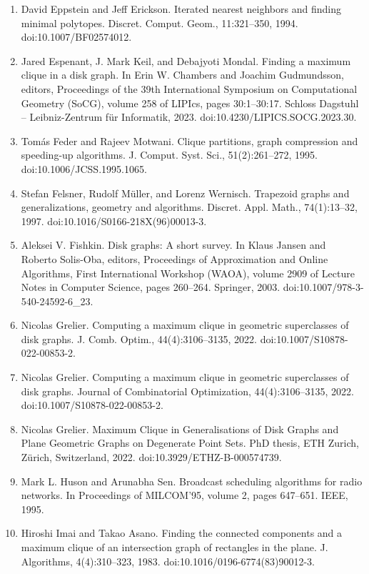\begin{enumerate}
\item[]  [20]  David Eppstein and Jeff Erickson.  Iterated nearest neighbors and finding minimal polytopes.  Discret. Comput. Geom., 11:321–350, 1994.  doi:10.1007/BF02574012.  
\item[]  [21]  Jared Espenant, J. Mark Keil, and Debajyoti Mondal.  Finding a maximum clique in a disk graph.  In Erin W. Chambers and Joachim Gudmundsson, editors, Proceedings of the 39th International Symposium on Computational Geometry (SoCG), volume 258 of LIPIcs, pages 30:1–30:17. Schloss Dagstuhl – Leibniz-Zentrum für Informatik, 2023.  doi:10.4230/LIPICS.SOCG.2023.30.  
\item[]  [22]  Tomás Feder and Rajeev Motwani.  Clique partitions, graph compression and speeding-up algorithms.  J. Comput. Syst. Sci., 51(2):261–272, 1995.  doi:10.1006/JCSS.1995.1065.  
\item[]  [23]  Stefan Felsner, Rudolf Müller, and Lorenz Wernisch.  Trapezoid graphs and generalizations, geometry and algorithms.  Discret. Appl. Math., 74(1):13–32, 1997.  doi:10.1016/S0166-218X(96)00013-3.  
\item[]  [24]  Aleksei V. Fishkin.  Disk graphs: A short survey.  In Klaus Jansen and Roberto Solis-Oba, editors, Proceedings of Approximation and Online Algorithms, First International Workshop (WAOA), volume 2909 of Lecture Notes in Computer Science, pages 260–264. Springer, 2003.  doi:10.1007/978-3-540-24592-6\_23.  
\item[]  [25]  Nicolas Grelier.  Computing a maximum clique in geometric superclasses of disk graphs.  J. Comb. Optim., 44(4):3106–3135, 2022.  doi:10.1007/S10878-022-00853-2.  
\item[]  [26]  Nicolas Grelier.  Computing a maximum clique in geometric superclasses of disk graphs.  Journal of Combinatorial Optimization, 44(4):3106–3135, 2022.  doi:10.1007/S10878-022-00853-2.  
\item[]  [27]  Nicolas Grelier.  Maximum Clique in Generalisations of Disk Graphs and Plane Geometric Graphs on Degenerate Point Sets.  PhD thesis, ETH Zurich, Zürich, Switzerland, 2022.  doi:10.3929/ETHZ-B-000574739.  
\item[]  [28]  Mark L. Huson and Arunabha Sen.  Broadcast scheduling algorithms for radio networks.  In Proceedings of MILCOM’95, volume 2, pages 647–651. IEEE, 1995.  
\item[]  [29]  Hiroshi Imai and Takao Asano.  Finding the connected components and a maximum clique of an intersection graph of rectangles in the plane.  J. Algorithms, 4(4):310–323, 1983.  doi:10.1016/0196-6774(83)90012-3.  

\end{enumerate}
